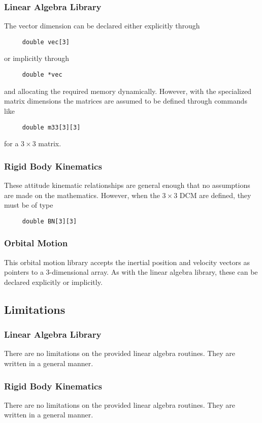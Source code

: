 \subsubsection{Linear Algebra Library}
The vector dimension can be declared either explicitly through 
\begin{verbatim}
     double vec[3]
\end{verbatim}
or implicitly through 
\begin{verbatim} 
     double *vec
\end{verbatim} 
and allocating the required memory dynamically.   However, with the specialized matrix dimensions the matrices are assumed to be defined through commands like 
\begin{verbatim}
     double m33[3][3]
\end{verbatim}
 for a $3\times 3$ matrix. 

\subsubsection{Rigid Body Kinematics}
These attitude kinematic relationships are general enough that no assumptions are made on the mathematics.  However, when the $3\times 3$ DCM are defined, they must be of type
\begin{verbatim}
     double BN[3][3]
\end{verbatim}


\subsubsection{Orbital Motion}
This orbital motion library accepts the inertial position and velocity vectors as pointers to a 3-dimensional array.  As with the linear algebra library, these can be declared explicitly or implicitly.    


\subsection{Limitations}
\subsubsection{Linear Algebra Library}
There are no limitations on the provided linear algebra routines.  They are written in a general manner. 

\subsubsection{Rigid Body Kinematics}
There are no limitations on the provided linear algebra routines.  They are written in a general manner.  

